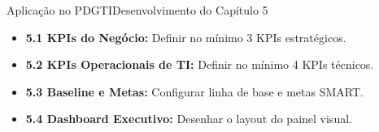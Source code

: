\begin{senaiframe}{Aplicação no PDGTI}{Desenvolvimento do Capítulo 5}
  \vspace{0.5cm}
  \begin{tcolorbox}[senaigreencard, title={Capítulo 5 – Gestão de Desempenho e Indicadores}]
    \begin{itemize}
      \item \textbf{5.1 KPIs do Negócio:} Definir no mínimo 3 KPIs estratégicos.
      \item \textbf{5.2 KPIs Operacionais de TI:} Definir no mínimo 4 KPIs técnicos.
      \item \textbf{5.3 Baseline e Metas:} Configurar linha de base e metas SMART.
      \item \textbf{5.4 Dashboard Executivo:} Desenhar o layout do painel visual.
    \end{itemize}
  \end{tcolorbox}
\end{senaiframe}
